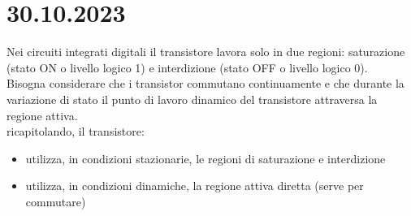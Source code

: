 \section*{30.10.2023}
Nei circuiti integrati digitali il transistore lavora solo in due regioni: saturazione (stato ON o livello logico 1) e interdizione (stato OFF o livello logico 0).\\
Bisogna considerare che i transistor commutano continuamente e che durante la variazione di stato il punto di lavoro
dinamico del transistore attraversa la regione attiva.\\
ricapitolando, il transistore:
%
\begin{itemize}
    \item utilizza, in condizioni stazionarie, le regioni di saturazione e interdizione
    \item utilizza, in condizioni dinamiche, la regione attiva diretta (serve per commutare)
\end{itemize}
%
